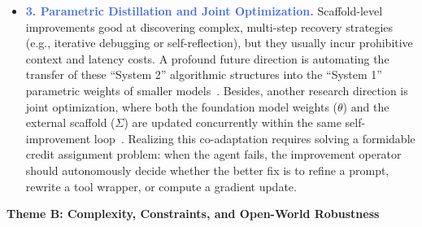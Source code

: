 \begin{itemize}[leftmargin=*, label={}, itemsep=0.9em, topsep=0.2em]
\item \textbf{\textcolor{RoyalBlue}{3.  Parametric Distillation and Joint Optimization.}} Scaffold-level improvements good at discovering complex, multi-step recovery strategies (e.g., iterative debugging or self-reflection), but they usually incur prohibitive context and latency costs. A profound future direction is automating the transfer of these ``System 2'' algorithmic structures into the ``System 1'' parametric weights of smaller models~\citep{qiu2025alitageneralistagentenabling}. Besides, another research direction is joint optimization, where both the foundation model weights ($\theta$) and the external scaffold ($\Sigma$) are updated concurrently within the same self-improvement loop~\citep{hebbar2026sia}. Realizing this co-adaptation requires solving a formidable credit assignment problem: when the agent fails, the improvement operator should autonomously decide whether the better fix is to refine a prompt, rewrite a tool wrapper, or compute a gradient update.
\end{itemize}

\vspace{0.55em}
\noindent\textbf{Theme B: Complexity, Constraints, and Open-World Robustness}
\vspace{0.2em}

